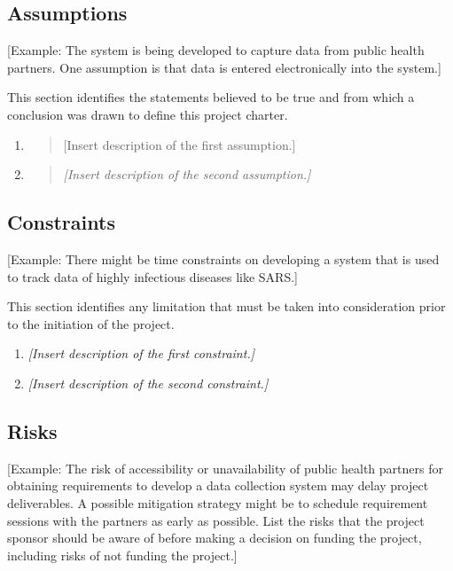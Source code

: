 \documentclass[a4paper, 11pt]{article}
\begin{document}
\hypertarget{assumptions}{%
\subsection{Assumptions}\label{assumptions}}

{[}Example: The system is being developed to capture data from public
health partners. One assumption is that data is entered electronically
into the system.{]}

This section identifies the statements believed to be true and from
which a conclusion was drawn to define this project charter.

\begin{enumerate}
\def\labelenumi{\arabic{enumi}.}
\item
  \begin{quote}
  {[}Insert description of the first assumption.{]}
  \end{quote}
\item
  \begin{quote}
  \emph{{[}Insert description of the second assumption.{]}}
  \end{quote}
\end{enumerate}

\hypertarget{constraints}{%
\subsection{Constraints}\label{constraints}}

{[}Example: There might be time constraints on developing a system that
is used to track data of highly infectious diseases like SARS.{]}

This section identifies any limitation that must be taken into
consideration prior to the initiation of the project.

\begin{enumerate}
\def\labelenumi{\arabic{enumi}.}
\item
  \emph{{[}Insert description of the first constraint.{]}}
\item
  \emph{{[}Insert description of the second constraint.{]}}
\end{enumerate}

\hypertarget{risks}{%
\subsection{Risks}\label{risks}}

{[}Example: The risk of accessibility or unavailability of public health
partners for obtaining requirements to develop a data collection system
may delay project deliverables. A possible mitigation strategy might be
to schedule requirement sessions with the partners as early as possible.
List the risks that the project sponsor should be aware of before making
a decision on funding the project, including risks of not funding the
project.{]}
\end{document}
